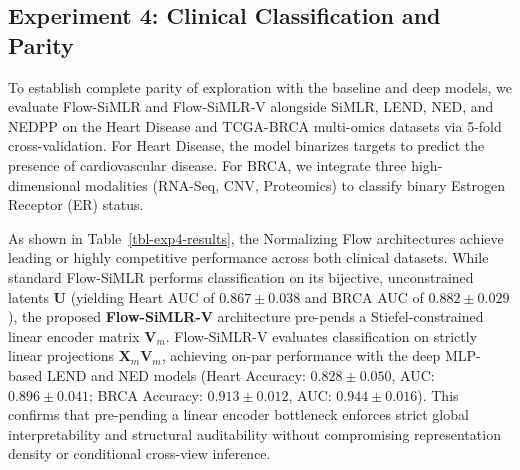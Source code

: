 \documentclass[
  letterpaper,
]{report}
\begin{document}
\subsection{Experiment 4: Clinical Classification and
Parity}\label{experiment-4-clinical-classification-and-parity}

To establish complete parity of exploration with the baseline and deep
models, we evaluate Flow-SiMLR and Flow-SiMLR-V alongside SiMLR, LEND,
NED, and NEDPP on the Heart Disease and TCGA-BRCA multi-omics datasets
via 5-fold cross-validation. For Heart Disease, the model binarizes
targets to predict the presence of cardiovascular disease. For BRCA, we
integrate three high-dimensional modalities (RNA-Seq, CNV, Proteomics)
to classify binary Estrogen Receptor (ER) status.

As shown in Table~\ref{tbl-exp4-results}, the Normalizing Flow
architectures achieve leading or highly competitive performance across
both clinical datasets. While standard Flow-SiMLR performs
classification on its bijective, unconstrained latents \(\mathbf{U}\)
(yielding Heart AUC of \(0.867 \pm 0.038\) and BRCA AUC of
\(0.882 \pm 0.029\)), the proposed \textbf{Flow-SiMLR-V} architecture
pre-pends a Stiefel-constrained linear encoder matrix \(\mathbf{V}_m\).
Flow-SiMLR-V evaluates classification on strictly linear projections
\(\mathbf{X}_m\mathbf{V}_m\), achieving on-par performance with the deep
MLP-based LEND and NED models (Heart Accuracy: \(0.828 \pm 0.050\), AUC:
\(0.896 \pm 0.041\); BRCA Accuracy: \(0.913 \pm 0.012\), AUC:
\(0.944 \pm 0.016\)). This confirms that pre-pending a linear encoder
bottleneck enforces strict global interpretability and structural
auditability without compromising representation density or conditional
cross-view inference.
\end{document}
